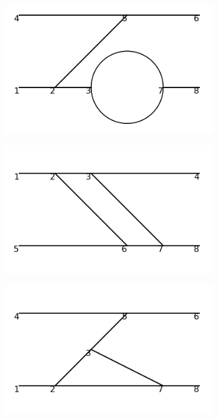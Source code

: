 \documentclass[11pt,a4paper,twoside,pdf]{article}
\numberwithin{equation}{section}
\begin{document}
\begin{figure}[h!]
    \centering
    \begin{subfigure}[t]{0.16\textwidth}
        \centering
        \includegraphics[width=\textwidth]{plots/order4_2to2/1.png}
    \end{subfigure}%
    \hfill
    \begin{subfigure}[t]{0.16\textwidth}
        \centering
        \includegraphics[width=\textwidth]{plots/order4_2to2/2.png}
    \end{subfigure}
    \hfill
    \begin{subfigure}[t]{0.16\textwidth}
        \centering
        \includegraphics[width=\textwidth]{plots/order4_2to2/3.png}

\end{subfigure}
\end{figure}
\end{document}
